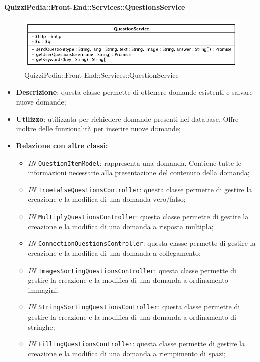 \paragraph{QuizziPedia::Front-End::Services::QuestionsService}
\begin{figure}[ht]
	\centering
	\includegraphics[scale=0.60]{UML/Classi/Front-End/QuizziPedia_Front-end_Services_QuestionService.png}
	\caption{QuizziPedia::Front-End::Services::QuestionService}
\end{figure}\FloatBarrier
\begin{itemize}
	\item \textbf{Descrizione}: questa classe permette di ottenere domande esistenti e salvare nuove domande;
	\item \textbf{Utilizzo}: utilizzata per richiedere domande presenti nel database. Offre inoltre delle funzionalità per inserire nuove domande;
	\item \textbf{Relazione con altre classi:}
	\begin{itemize}
		\item \textit{IN} \texttt{QuestionItemModel}: rappresenta una domanda. Contiene tutte le informazioni necessarie alla
		presentazione del contenuto della domanda; 
		\item \textit{IN} \texttt{TrueFalseQuestionsController}: questa classe permette di gestire la creazione e la modifica di una domanda vero/falso;
		\item \textit{IN} \texttt{MultiplyQuestionsController}: questa classe permette di gestire la creazione e la modifica di una domanda a risposta multipla; 
		\item \textit{IN} \texttt{ConnectionQuestionsController}: questa classe permette di gestire la creazione e la modifica di una domanda a collegamento;
		\item \textit{IN} \texttt{ImagesSortingQuestionsController}: questa classe permette di gestire la creazione e la modifica di una domanda a ordinamento immagini;
		\item \textit{IN} \texttt{StringsSortingQuestionsController}: questa classe permette di gestire la creazione e la modifica di una domanda a ordinamento di stringhe;
		\item \textit{IN} \texttt{FillingQuestionsController}: questa classe permette di gestire la creazione e la modifica di una domanda a riempimento di spazi; 

\end{itemize}
\end{itemize}
